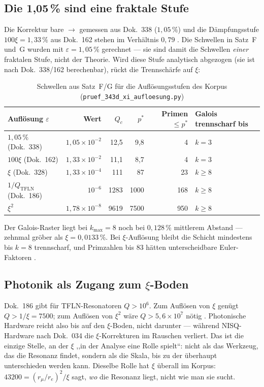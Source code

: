 \subsection{Die 1,05\,\% sind eine fraktale Stufe}

Die Korrektur bare $\to$ gemessen aus Dok.~338 ($1{,}05\,\%$) und die
Dämpfungsstufe $100\xi = 1{,}33\,\%$ aus Dok.~162 stehen im Verhältnis $0{,}79$
\BM. Die Schwellen in Satz~F und~G wurden mit $\varepsilon = 1{,}05\,\%$
gerechnet --- sie sind damit die Schwellen \emph{einer} fraktalen Stufe, nicht
der Theorie. Wird diese Stufe analytisch abgezogen (sie ist nach Dok.~338/162
berechenbar), rückt die Trennschärfe auf $\xi$:

\begin{table}[H]
\centering
\caption{Schwellen aus Satz~F/G für die Auflösungsstufen des Korpus
  (\texttt{pruef\_343d\_xi\_aufloesung.py})}
\begin{tabular}{lrrrrl}
\toprule
Auflösung $\varepsilon$ & Wert & $Q_c$ & $p^*$ & Primen $\leq p^*$ & Galois trennscharf bis \\
\midrule
$1{,}05\,\%$ (Dok.~338) & $1{,}05\times10^{-2}$ & 12{,}5 & 9{,}8 & 4 & $k=3$ \\
$100\xi$ (Dok.~162) & $1{,}33\times10^{-2}$ & 11{,}1 & 8{,}7 & 4 & $k=3$ \\
$\xi$ (Dok.~328) & $1{,}33\times10^{-4}$ & 111 & 87 & 23 & $k\geq 8$ \\
$1/Q_\mathrm{TFLN}$ (Dok.~186) & $10^{-6}$ & 1283 & 1000 & 168 & $k\geq 8$ \\
$\xi^2$ & $1{,}78\times10^{-8}$ & 9619 & 7500 & 950 & $k\geq 8$ \\
\bottomrule
\end{tabular}
\end{table}

Der Galois-Raster liegt bei $k_\mathrm{max}=8$ noch bei $0{,}128\,\%$
mittlerem Abstand --- zehnmal gröber als $\xi = 0{,}0133\,\%$. Bei
$\xi$-Auflösung bleibt die Schicht mindestens bis $k=8$ trennscharf, und
Primzahlen bis $83$ hätten unterscheidbare Euler-Faktoren \BM.

\subsection{Photonik als Zugang zum $\xi$-Boden}

Dok.~186 gibt für TFLN-Resonatoren $Q > 10^6$. Zum Auflösen von $\xi$ genügt
$Q > 1/\xi = 7500$; zum Auflösen von $\xi^2$ wäre $Q > 5{,}6\times10^7$ nötig
\BM. Photonische Hardware reicht also bis auf den $\xi$-Boden, nicht darunter
--- während NISQ-Hardware nach Dok.~034 die $\xi$-Korrekturen im Rauschen
verliert. Das ist die einzige Stelle, an der $\xi$ ,,in der Analyse eine Rolle
spielt``: nicht als das Werkzeug, das die Resonanz findet, sondern als die
Skala, bis zu der überhaupt unterschieden werden kann. Dieselbe Rolle hat $\xi$
überall im Korpus: $43200 = (r_\mu/r_e)^2/\xi$ sagt, \emph{wo} die Resonanz
liegt, nicht wie man sie sucht.

